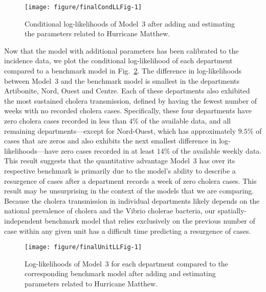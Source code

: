 \begin{figure}[!ht]
\begin{knitrout}
\color{fgcolor}
\texttt{[image: figure/finalCondLLFig-1]} 
\end{knitrout}
\caption[Conditional log-likelihoods with hurricane adjustment]{\label{fig:finalCondLL}Conditional log-likelihoods of Model~3 after adding and estimating the parameters related to Hurricane Matthew.}
\end{figure}

Now that the model with additional parameters has been calibrated to the incidence data, we plot the conditional log-likelihood of each department compared to a benchmark model in Fig.~\ref{fig:finalUnitLL}.
The difference in log-likelihoods between Model~3 and the benchmark model is smallest in the departments Artibonite, Nord, Ouest and Centre.
Each of these departments also exhibited the most sustained cholera transmission, defined by having the fewest number of weeks with no recorded cholera cases.
Specifically, these four departments have zero cholera cases recorded in less than $4\%$ of the available data, and all remaining departments---except for Nord-Ouest, which has approximately $9.5\%$ of cases that are zeros and also exhibits the next smallest difference in log-likelihoods---have zero cases recorded in at least $14\%$ of the available weekly data.
This result suggests that the quantitative advantage Model~3 has over its respective benchmark is primarily due to the model's ability to describe a resurgence of cases after a department records a week of zero cholera cases.
This result may be unsurprising in the context of the models that we are comparing.
Because the cholera transmission in individual departments likely depends on the national prevalence of cholera and the Vibrio cholerae bacteria, our spatially-independent benchmark model that relies exclusively on the previous number of case within any given unit has a difficult time predicting a resurgence of cases.

\begin{figure}[!ht]
\begin{knitrout}
\color{fgcolor}
\texttt{[image: figure/finalUnitLLFig-1]} 
\end{knitrout}
\caption{\label{fig:finalUnitLL}Log-likelihoods of Model~3 for each department compared to the corresponding benchmark model after adding and estimating parameters related to Hurricane Matthew.}
\end{figure}

